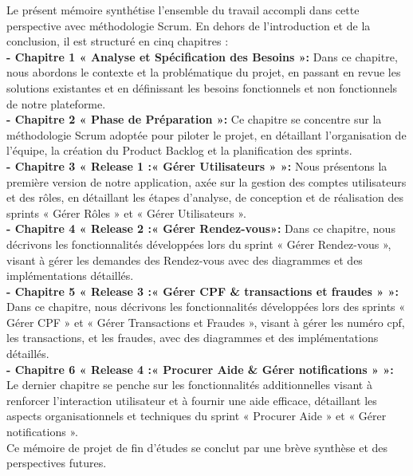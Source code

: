 Le présent mémoire synthétise l'ensemble du travail accompli dans cette perspective avec méthodologie Scrum. En dehors de l'introduction et de la conclusion, il est structuré en cinq chapitres :
\\
\textbf{- Chapitre 1 « Analyse et Spécification des Besoins »:}
Dans ce chapitre, nous abordons le contexte et la problématique du projet, en passant en revue les solutions existantes et en définissant les besoins fonctionnels et non fonctionnels de notre plateforme.\\
\textbf{- Chapitre 2 « Phase de Préparation »:}
Ce chapitre se concentre sur la méthodologie Scrum adoptée pour piloter le projet, en détaillant l'organisation de l'équipe, la création du Product Backlog et la planification des sprints.\\
\textbf{- Chapitre 3 « Release 1 :« Gérer Utilisateurs » »:}
Nous présentons la première version de notre application, axée sur la gestion des comptes utilisateurs et des rôles, en détaillant les étapes d'analyse, de conception et de réalisation des sprints « Gérer Rôles » et « Gérer Utilisateurs ».\\
\textbf{- Chapitre 4 « Release 2 :« Gérer Rendez-vous»:}
Dans ce chapitre, nous décrivons les fonctionnalités développées lors du sprint  « Gérer Rendez-vous », visant à gérer les demandes des Rendez-vous avec des diagrammes et des implémentations détaillés.\\
\textbf{- Chapitre 5 « Release 3 :« Gérer CPF \& transactions et fraudes » »:}
Dans ce chapitre, nous décrivons les fonctionnalités développées lors des sprints  « Gérer CPF » et  « Gérer Transactions et Fraudes », visant à gérer les numéro cpf, les transactions, et les fraudes, avec des diagrammes et des implémentations détaillés.\\
\textbf{- Chapitre 6 « Release 4 :« Procurer Aide \& Gérer notifications » »:}
Le dernier chapitre se penche sur les fonctionnalités additionnelles visant à renforcer l'interaction utilisateur et à fournir une aide efficace, détaillant les aspects organisationnels et techniques du sprint  « Procurer Aide » et « Gérer notifications ».\\
Ce mémoire de projet de fin d’études se conclut par une brève synthèse et des perspectives futures.

